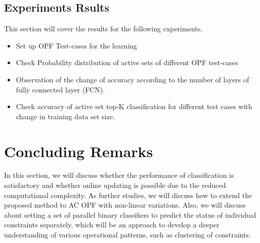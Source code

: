 \documentclass[11pt]{article}
\begin{document}
\subsection{Experiments Rsults}
This section will cover the results for the following experiments.
\begin{itemize}
  \item Set up OPF Test-cases for the learning
  \item Check Probability distribution of active sets of different OPF test-cases
  \item Observation of the change of accuracy according to the number of layers of fully connected layer (FCN).
  \item Check accuracy of active set top-K classification for different test cases with change in training data set size.
\end{itemize}



\section{Concluding Remarks}\label{sec:conclusions}
In this section, we will discuss whether the performance of classification is satisfactory and whether online updating is possible due to the reduced computational complexity. As further studies, we will discuss how to extend the proposed method to AC OPF with non-linear variations. Also, we will discuss about setting a set of parallel binary classifiers to predict the status of individual constraints separately, which will be an approach to develop a deeper understanding of various operational patterns, such as clustering of constraints. 
\end{document}
